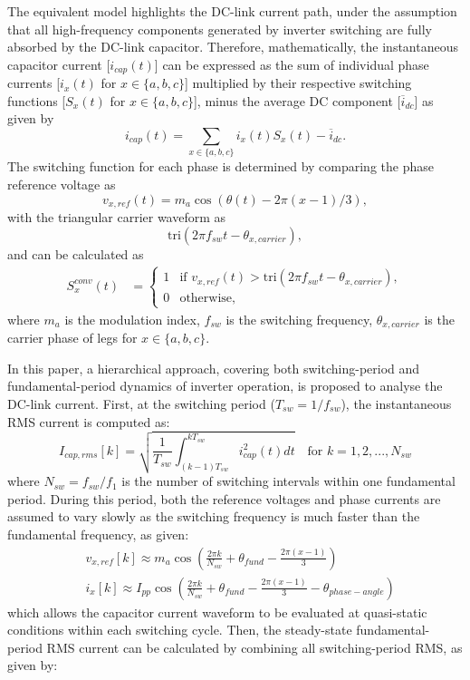 \documentclass{IPEC2026}
\begin{document}
The equivalent model highlights the DC-link current path, under the assumption that all high-frequency components generated by inverter switching are fully absorbed by the DC-link capacitor.
Therefore, mathematically, the instantaneous capacitor current [$i_{cap}(t)$] can be expressed as the sum of individual phase currents [$i_x(t)$ for $x\in\{a,b,c\}$] multiplied by their respective switching functions [$S_x(t)$ for $x\in\{a,b,c\}$], minus the average DC component [$\overline{i}_{dc}$] as given by
\begin{equation}
    i_{cap}(t) = \sum_{x\in\{a,b,c\}} i_x(t)S_x(t) - \overline{i}_{dc}.
\end{equation}
The switching function for each phase is determined by comparing the phase reference voltage as 
\begin{equation}
    v_{x,ref}(t) = m_a\cos(\theta(t) - 2\pi(x-1)/3),
\end{equation}
with the triangular carrier waveform as
\begin{equation}
\text{tri}(2\pi f_{sw}t-\theta_{x,carrier}),
\end{equation}
and can be calculated as 
\begin{equation}
\begin{aligned}
S_x^{conv}(t) &= 
\begin{cases} 
1 & \text{if } v_{x,ref}(t) > \text{tri}(2\pi f_{sw}t-\theta_{x,carrier}), \\
0 & \text{otherwise},
\end{cases}
\end{aligned}
\end{equation}
where $m_a$ is the modulation index, $f_{sw}$ is the switching frequency, $\theta_{x,carrier}$ is the carrier phase of legs for $x\in\{a,b,c\}$. 


In this paper, a hierarchical approach, covering both switching-period and fundamental-period dynamics of inverter operation, is proposed to analyse the DC-link current. 
First, at the switching period ($T_{sw} = 1/f_{sw}$), the instantaneous RMS current is computed as:
\begin{equation}
I_{cap,rms}[k] = \sqrt{\frac{1}{T_{sw}}\int_{(k-1)T_{sw}}^{kT_{sw}} i_{cap}^2(t) dt}\quad \text{for } k = 1,2,...,N_{sw}
\end{equation}
where $N_{sw} = f_{sw}/f_1$ is the number of switching intervals within one fundamental period.
During this period, both the reference voltages and phase currents are assumed to vary slowly as the switching frequency is much faster than the fundamental frequency, as given:
\begin{equation}
\begin{aligned}
&v_{x,ref}[k] \approx m_a\cos\left(\frac{2\pi k}{N_{sw}} + \theta_{fund} - \frac{2\pi(x-1)}{3}\right) \\
&i_x[k] \approx I_{pp}\cos\left(\frac{2\pi k}{N_{sw}} + \theta_{fund} - \frac{2\pi(x-1)}{3} - \theta_{phase-angle}\right)
\end{aligned}
\end{equation}
which allows the capacitor current waveform to be evaluated at quasi-static conditions within each switching cycle.
Then, the steady-state fundamental-period RMS current can be calculated by combining all switching-period RMS, as given by:
\end{document}
